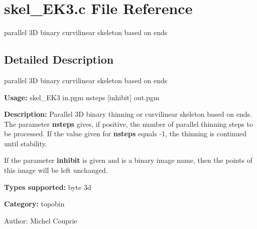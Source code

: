 \section{skel\_\-EK3.c File Reference}
\label{skel__EK3_8c}
parallel 3D binary curvilinear skeleton based on ends 



\subsection{Detailed Description}
parallel 3D binary curvilinear skeleton based on ends 

{\bf Usage:} skel\_\-EK3 in.pgm nsteps [inhibit] out.pgm

{\bf Description:} Parallel 3D binary thinning or curvilinear skeleton based on ends. The parameter {\bf nsteps} gives, if positive, the number of parallel thinning steps to be processed. If the value given for {\bf nsteps} equals -1, the thinning is continued until stability.

If the parameter {\bf inhibit} is given and is a binary image name, then the points of this image will be left unchanged.

{\bf Types supported:} byte 3d

{\bf Category:} topobin

\begin{Desc}
\item[Author:]Michel Couprie \end{Desc}
